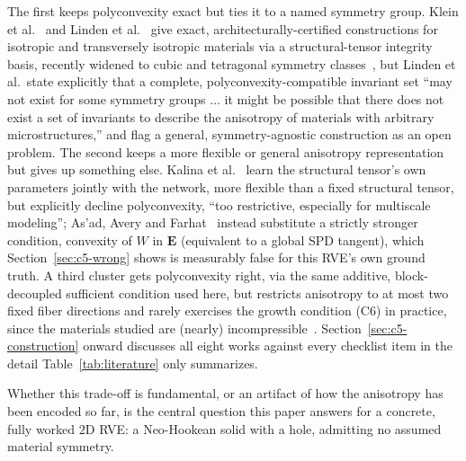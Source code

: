 \documentclass[10pt,a4paper]{article}
\begin{document}
The first keeps polyconvexity exact but ties it to a named symmetry
group. Klein et al.~\cite{Klein2022} and Linden et
al.~\cite{Linden2023} give exact, architecturally-certified constructions
for isotropic and transversely isotropic materials via a
structural-tensor integrity basis, recently widened to cubic and
tetragonal symmetry classes~\cite{Klein2026}, but Linden et al.\ state
explicitly that a complete, polyconvexity-compatible invariant set ``may
not exist for some symmetry groups $\dots$ it might be possible that
there does not exist a set of invariants to describe the anisotropy of
materials with arbitrary microstructures,'' and flag a general,
symmetry-agnostic construction as an open problem. The second keeps a
more flexible or general anisotropy representation but gives up
something else. Kalina et al.~\cite{Kalina2024} learn the structural
tensor's own parameters jointly with the network, more flexible than a
fixed structural tensor, but explicitly decline polyconvexity, ``too
restrictive, especially for multiscale modeling''; As'ad, Avery and
Farhat~\cite{Asad2022} instead substitute a strictly stronger condition,
convexity of $W$ in $\bm E$ (equivalent to a global SPD tangent), which
Section~\ref{sec:c5-wrong} shows is measurably false for this RVE's own
ground truth. A third cluster gets polyconvexity right, via the same
additive, block-decoupled sufficient condition used here, but restricts
anisotropy to at most two fixed fiber directions and rarely exercises the
growth condition (C6) in practice, since the materials studied are
(nearly) incompressible~\cite{Linka2023,Tac2023,Thakolkaran2025}.
Section~\ref{sec:c5-construction} onward discusses all eight works
against every checklist item in the detail Table~\ref{tab:literature}
only summarizes.

Whether this trade-off is fundamental, or an artifact of how the
anisotropy has been encoded so far, is the central question this
paper answers for a concrete, fully worked $2$D RVE: a Neo-Hookean
solid with a hole, admitting no assumed material symmetry.
\end{document}

